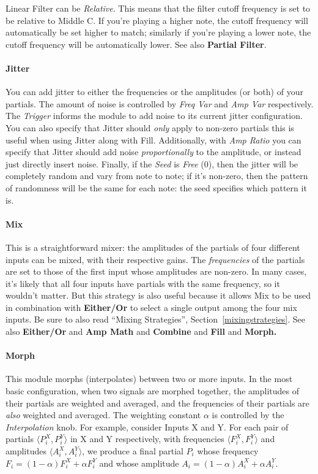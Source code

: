 \documentclass{article}
\begin{document}
Linear Filter can be {\it Relative}.  This means that the filter cutoff frequency is set to be relative to Middle C.  If you're playing a higher note, the cutoff frequency will automatically be set higher to match; similarly if you're playing a lower note, the cutoff frequency will be automatically lower.  See also {\bf Partial Filter}.

\paragraph{Jitter} You can add jitter to either the frequencies or the amplitudes (or both) of your partials.  The amount of noise is controlled by {\it Freq Var} and {\it Amp Var} respectively.  The {\it Trigger} informs the module to add noise to its current jitter configuration.  You can also specify that Jitter should {\it only} apply to non-zero partials this is useful when using Jitter along with Fill.   Additionally, with {\it Amp Ratio} you can specify that Jitter should add noise {\it proportionally} to the amplitude, or instead just directly insert noise.  Finally, if the {\it Seed} is {\it Free} (0), then the jitter will be completely random and vary from note to note; if it's non-zero, then the pattern of randomness will be the same for each note: the seed specifies which pattern it is.


\paragraph{Mix} This is a straightforward mixer: the amplitudes of the partials of four different inputs can be mixed, with their respective gains.  The {\it frequencies} of the partials are set to those of the first input whose amplitudes are non-zero.  In many cases, it's likely that all four inputs have partials with the same frequency, so it wouldn't matter.  But this strategy is also useful because it allows Mix to be used in combination with {\bf Either/Or} to select a single output among the four mix inputs.  Be sure to also read ``Mixing Strategies'', Section~\ref{mixingstrategies}.  See also {\bf Either/Or} and {\bf Amp Math} and {\bf Combine} and {\bf Fill} and {\bf Morph.}

\paragraph{Morph} This module morphs (interpolates) between two or more inputs.  In the most basic configuration, when two signals are morphed together, the amplitudes of their partials are weighted and averaged, and the frequencies of their partials are {\it also} weighted and averaged.  The weighting constant \(\alpha\) is controlled by the {\it Interpolation} knob.  For example, consider Inputs X and Y.  For each pair of partials \(\langle P^X_i, P^Y_i\rangle\) in X and Y respectively, with frequencies \(\langle F^X_i, F^Y_i\rangle\) and amplitudes \(\langle A^X_i, A^Y_i\rangle\), we produce a final partial \(P_i\) whose frequency \(F_i = (1-\alpha) F^X_i + \alpha F^Y_i\) and whose amplitude \(A_i = (1-\alpha) A^X_i + \alpha A^Y_i\).
\end{document}
